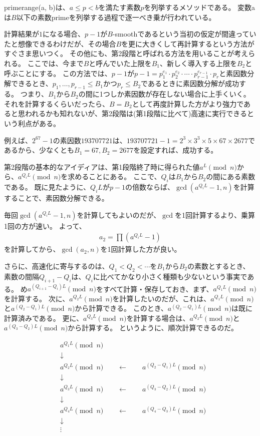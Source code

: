 
primerange(a, b)は、$a \le p < b$を満たす素数$p$を列挙するメソッドである。
変数aは$B$以下の素数primeを列挙する過程で逐一べき乗が行われている。

計算結果が$1$になる場合、$p-1$が$B$-smoothであるという当初の仮定が間違っていたと想像できるわけだが、その場合$B$を更に大きくして再計算するという方法がすぐさま思いつく。
その他にも、第2段階と呼ばれる方法を用いることが考えられる。
ここでは、今まで$B$と呼んでいた上限を$B_1$、新しく導入する上限を$B_2$と呼ぶことにする。
この方法では、$p-1$が$p-1=p_1^{e_1}\cdot p_2^{e_2}\cdot\cdots\cdot p_{r-1}^{e_{r-1}}\cdot p_r$と素因数分解できるとき、$p_1,\ldots,p_{r-1}\le B_1$かつ$p_r\le B_2$であるときに素因数分解が成功する。
つまり、$B_1$から$B_2$の間に1つしか素因数が存在しない場合に上手くいく。
それを計算するくらいだったら、$B=B_2$として再度計算した方がより強力であると思われるかも知れないが、第2段階は(第1段階に比べて)高速に実行できるという利点がある。

例えば、$2^{67}-1$の素因数$193707721$は、$193707721-1=2^3\times3^3\times5\times67\times2677$であるから、少なくとも$B_1=67, B_2=2677$を設定すれば、成功する。

第2段階の基本的なアイディアは、第1段階終了時に得られた値$a^L\pmod{n}$から、$a^{Q_iL}\pmod{n}$を求めることにある。
ここで、$Q_i$は$B_1$から$B_2$の間にある素数である。
既に見たように、$Q_iL$が$p-1$の倍数ならば、$\gcd(a^{Q_iL}-1,n)$を計算することで、素因数分解できる。

毎回$\gcd(a^{Q_iL}-1,n)$を計算してもよいのだが、$\gcd$を1回計算するより、乗算1回の方が速い。
よって、
\begin{align*}
a_2 = \prod(a^{Q_iL}-1)
\end{align*}
を計算してから、$\gcd(a_2, n)$を1回計算した方が良い。

さらに、高速化に寄与するのは、$Q_1<Q_2<\cdots$を$B_1$から$B_2$の素数とするとき、素数の間隔$Q_{i+1}-Q_i$は、$Q_i$に比べてかなり小さく種類も少ないという事実である。
め$a^{(Q_{i+1}-Q_i)L}\pmod{n}$をすべて計算・保存しておき、まず、$a^{Q_1L}\pmod{n}$を計算する。
次に、$a^{Q_2L}\pmod{n}$を計算したいのだが、これは、$a^{Q_1L}\pmod{n}$と$a^{(Q_2-Q_1)L}\pmod{n}$から計算できる。
このとき、$a^{(Q_2-Q_1)L}\pmod{n}$は既に計算済みである。
更に、$a^{Q_3L}\pmod{n}$を計算する場合は、$a^{Q_2L}\pmod{n}$と$a^{(Q_3-Q_2)L}\pmod{n}$から計算する。
というように、順次計算できるのだ。

\begin{align*}
&a^{Q_1L}\pmod{n}\\
&\downarrow \\
&a^{Q_2L}\pmod{n} \qquad\leftarrow\qquad a^{(Q_2-Q_1)L}\pmod{n}\\
&\downarrow \\
&a^{Q_3L}\pmod{n} \qquad\leftarrow\qquad a^{(Q_3-Q_2)L}\pmod{n}\\
&\downarrow \\
&a^{Q_4L}\pmod{n} \qquad\leftarrow\qquad a^{(Q_4-Q_3)L}\pmod{n}\\
&\downarrow \\
&\vdots
\end{align*}

